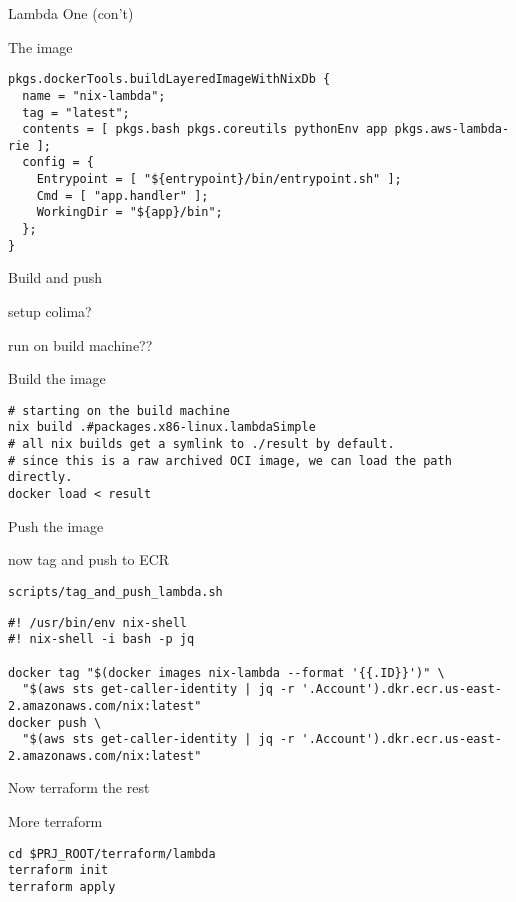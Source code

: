 \documentclass[bigger]{beamer}
\begin{document}
\begin{frame}[label={sec:orgd7b7461},fragile]{Lambda One (con't)}
 \begin{block}{The image}
\tiny
\begin{verbatim}
pkgs.dockerTools.buildLayeredImageWithNixDb {
  name = "nix-lambda";
  tag = "latest";
  contents = [ pkgs.bash pkgs.coreutils pythonEnv app pkgs.aws-lambda-rie ];
  config = {
    Entrypoint = [ "${entrypoint}/bin/entrypoint.sh" ];
    Cmd = [ "app.handler" ];
    WorkingDir = "${app}/bin";
  };
}
\end{verbatim}
\end{block}
\end{frame}
\begin{frame}[label={sec:org86e674e},fragile]{Build and push}
 \begin{block}{setup colima?}
\end{block}
\begin{block}{run on build machine??}
\end{block}
\begin{exampleblock}{Build the image}
\tiny
\begin{verbatim}
# starting on the build machine
nix build .#packages.x86-linux.lambdaSimple
# all nix builds get a symlink to ./result by default.
# since this is a raw archived OCI image, we can load the path directly.
docker load < result
\end{verbatim}
\end{exampleblock}
\end{frame}
\begin{frame}[label={sec:orgb23ac12},fragile]{Push the image}
 \begin{exampleblock}{now tag and push to ECR}
\begin{verbatim}
scripts/tag_and_push_lambda.sh
\end{verbatim}
\tiny
\begin{verbatim}
#! /usr/bin/env nix-shell
#! nix-shell -i bash -p jq

docker tag "$(docker images nix-lambda --format '{{.ID}}')" \
  "$(aws sts get-caller-identity | jq -r '.Account').dkr.ecr.us-east-2.amazonaws.com/nix:latest"
docker push \
  "$(aws sts get-caller-identity | jq -r '.Account').dkr.ecr.us-east-2.amazonaws.com/nix:latest"
\end{verbatim}
\end{exampleblock}
\end{frame}
\begin{frame}[label={sec:org9ffd730},fragile]{Now terraform the rest}
 \begin{exampleblock}{More terraform}
\begin{verbatim}
cd $PRJ_ROOT/terraform/lambda
terraform init
terraform apply
\end{verbatim}
\end{exampleblock}
\end{frame}
\end{document}
